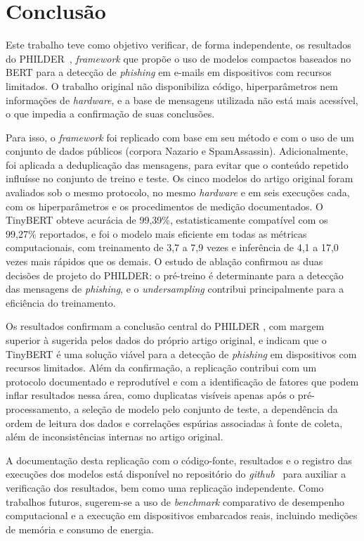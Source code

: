 \documentclass[12pt]{article}
\begin{document}
 
\section{Conclusão}
\label{sec:conclusao}


        Este trabalho teve como objetivo verificar, de forma independente, os resultados do PHILDER~\cite{bispo2025philder},  \textit{framework} que propõe o uso de modelos compactos baseados no BERT para a detecção de \textit{phishing} em e-mails em dispositivos com recursos limitados. O trabalho original não disponibiliza código, hiperparâmetros nem informações de \textit{hardware}, e a base de mensagens utilizada não está mais acessível, o que impedia a confirmação de suas conclusões.

        Para isso, o \textit{framework} foi replicado com base em seu método e com o uso de um conjunto de dados públicos (corpora Nazario e SpamAssassin). Adicionalmente, foi aplicada a deduplicação das mensagens, para evitar que o conteúdo repetido influísse no conjunto de treino e teste. Os cinco modelos do artigo original foram avaliados sob o mesmo protocolo, no mesmo \textit{hardware} e em seis execuções cada, com os hiperparâmetros e os procedimentos de medição documentados. O TinyBERT obteve acurácia de 99,39\%, estatisticamente compatível com os 99,27\% reportados, e foi o modelo mais eficiente em todas as métricas computacionais, com treinamento de 3,7 a 7,9 vezes e inferência de 4,1 a 17,0 vezes mais rápidos que os demais. O estudo de ablação confirmou as duas decisões de projeto do PHILDER: o pré-treino é determinante para a detecção das mensagens de \textit{phishing}, e o \textit{undersampling} contribui principalmente para a eficiência do treinamento.

        Os resultados confirmam a conclusão central do PHILDER \cite{bispo2025philder}, com margem superior à sugerida pelos dados do próprio artigo original, e indicam que o TinyBERT é uma solução viável para a detecção de \textit{phishing} em dispositivos com recursos limitados. Além da confirmação, a replicação contribui com um protocolo documentado e reprodutível e com a identificação de fatores que podem inflar resultados nessa área, como duplicatas visíveis apenas após o pré-processamento, a seleção de modelo pelo conjunto de teste, a dependência da ordem de leitura dos dados e correlações espúrias associadas à fonte de coleta, além de inconsistências internas no artigo original. 
        
        A documentação desta replicação com o código-fonte, resultados e o registro das execuções dos modelos está disponível no repositório do \textit{github}~\cite{santosjunior2026philderrepl} para auxiliar a verificação dos resultados, bem como uma replicação independente. Como trabalhos futuros, sugerem-se a uso de \textit{benchmark} comparativo de desempenho computacional e a execução em dispositivos embarcados reais, incluindo medições de memória e consumo de energia.



\end{document}
